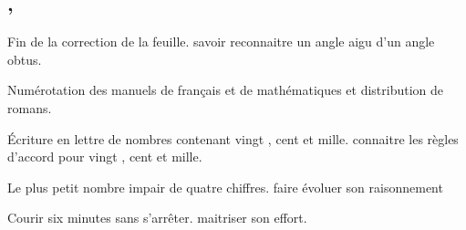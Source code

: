 \documentclass{article}
\begin{document}
	
	\subsection{ \sep}
	\Dis\cma{} Fin de la correction de la feuille.
	\obj savoir reconnaitre un angle aigu d’un angle obtus.
	
	\dIs\cfr{} Numérotation des manuels de français et de mathématiques et distribution de romans.
	
	\dIs\cma{}Écriture en lettre de nombres contenant \og vingt \fg{}, \og cent \fg{} et \og mille\fg{}.
	\obj connaitre les règles d’accord pour \og vingt \fg{}, \og cent \fg{} et \og mille\fg{}.
	
	\dIs\cma{} Le plus petit nombre impair de quatre chiffres.
	\obj faire évoluer son raisonnement
	
	\dIs\csp{} Courir six minutes sans s’arrêter.
	\obj maitriser son effort.
	
	
	
	
	
	
	\setlength{\parskip}{0ex}
	\tableofcontents
\end{document}
